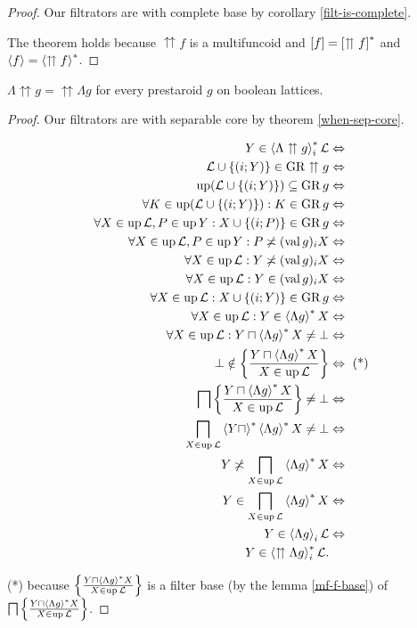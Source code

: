 \begin{proof}
Our filtrators are with complete base by corollary \ref{filt-is-complete}.

The theorem holds because $\upuparrows f$ is a multifuncoid and $\mathord{\mathrel{\left[f\right]}}=\mathord{\mathrel{\left[\upuparrows f\right]^{\ast}}}$
and $\left\langle f\right\rangle=\left\langle \upuparrows f\right\rangle ^{\ast}$.
\end{proof}
\begin{prop}
$\Lambda\upuparrows g=\upuparrows\Lambda g$ for every prestaroid
$g$ on boolean lattices.\end{prop}
\begin{proof}
Our filtrators are with separable core by theorem \ref{when-sep-core}.

\begin{align*}
Y\in\left\langle \Lambda\upuparrows g\right\rangle ^{\ast}_{i}\mathcal{L} & \Leftrightarrow\\
\mathcal{L}\cup\{(i;Y)\}\in\operatorname{GR}\upuparrows g & \Leftrightarrow\\
\operatorname{up}(\mathcal{L}\cup\{(i;Y)\})\subseteq\operatorname{GR} g & \Leftrightarrow\\
\forall K\in\operatorname{up}(\mathcal{L}\cup\{(i;Y)\}):K\in\operatorname{GR} g & \Leftrightarrow\\
\forall X\in\operatorname{up}\mathcal{L},P\in\operatorname{up} Y:X\cup\{(i;P)\}\in\operatorname{GR} g & \Leftrightarrow\\
\forall X\in\operatorname{up}\mathcal{L},P\in\operatorname{up} Y:P\not\asymp(\operatorname{val} g)_{i}X & \Leftrightarrow\\
\forall X\in\operatorname{up}\mathcal{L}:Y\not\asymp(\operatorname{val} g)_{i}X & \Leftrightarrow\\
\forall X\in\operatorname{up}\mathcal{L}:Y\in(\operatorname{val} g)_{i}X & \Leftrightarrow\\
\forall X\in\operatorname{up}\mathcal{L}:X\cup\{(i;Y)\}\in\operatorname{GR} g & \Leftrightarrow\\
\forall X\in\operatorname{up}\mathcal{L}:Y\in\left\langle \Lambda g\right\rangle ^{\ast}X & \Leftrightarrow\\
\forall X\in\operatorname{up}\mathcal{L}:Y\sqcap\left\langle \Lambda g\right\rangle ^{\ast}X\ne\bot & \Leftrightarrow\\
\bot\notin\left\{ \frac{Y\sqcap\left\langle \Lambda g\right\rangle ^{\ast}X}{X\in\operatorname{up}\mathcal{L}}\right\} & \Leftrightarrow\text{ (*)}\\
\bigsqcap\left\{ \frac{Y\sqcap\left\langle \Lambda g\right\rangle ^{\ast}X}{X\in\operatorname{up}\mathcal{L}}\right\}\ne\bot & \Leftrightarrow\\
\bigsqcap_{X\in\operatorname{up}\mathcal{L}}\left\langle Y\sqcap\right\rangle ^{\ast}\left\langle \Lambda g\right\rangle ^{\ast}X\ne\bot & \Leftrightarrow\\
Y\not\asymp\bigsqcap_{X\in\operatorname{up}\mathcal{L}}\left\langle \Lambda g\right\rangle ^{\ast}X & \Leftrightarrow\\
Y\in\bigsqcap_{X\in\operatorname{up}\mathcal{L}}\left\langle \Lambda g\right\rangle ^{\ast}X & \Leftrightarrow\\
Y\in\left\langle \Lambda g\right\rangle_{i}\mathcal{L} & \Leftrightarrow\\
Y\in\left\langle \upuparrows\Lambda g\right\rangle ^{\ast}_{i}\mathcal{L}.
\end{align*}


({*}) because $\left\{ \frac{Y\sqcap\left\langle \Lambda g\right\rangle ^{\ast}X}{X\in\operatorname{up}\mathcal{L}}\right\}$
is a filter base (by the lemma \ref{mf-f-base}) of $\bigsqcap\left\{ \frac{Y\sqcap\left\langle \Lambda g\right\rangle ^{\ast}X}{X\in\operatorname{up}\mathcal{L}}\right\}$.\end{proof}
